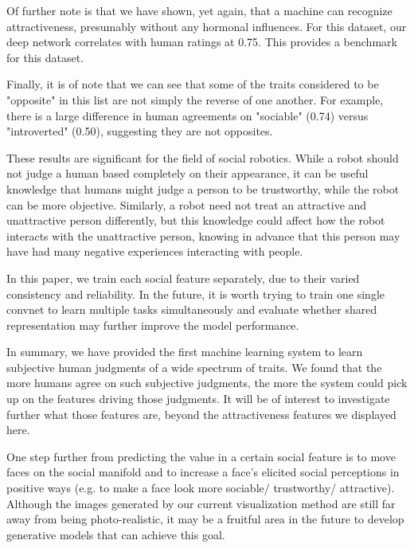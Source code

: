 \documentclass[10pt,twocolumn,letterpaper]{article}
\begin{document}
Of further note is that we have shown, yet again, that a machine can recognize attractiveness, presumably without any hormonal influences. For this dataset, our deep network correlates with human ratings at 0.75. This provides a benchmark for this dataset. 

Finally, it is of note that we can see that some of the traits considered to be "opposite" in this list are not simply the reverse of one another. For example, there is a large difference in human agreements on "sociable" (0.74) versus "introverted" (0.50), suggesting they are not opposites. 

These results are significant for the field of social robotics. While a robot should not judge a human based completely on their appearance, it can be useful knowledge that humans might judge a person to be trustworthy, while the robot can be more objective. Similarly, a robot need not treat an attractive and unattractive person differently, but this knowledge could affect how the robot interacts with the unattractive person, knowing in advance that this person may have had many negative experiences interacting with people.

In this paper, we train each social feature separately, due to their varied consistency and reliability. In the future, it is worth trying to train one single convnet to learn multiple tasks simultaneously and evaluate whether shared representation may further improve the model performance. 

In summary, we have provided the first machine learning system to learn subjective human judgments of a wide spectrum of traits. We found that the more humans agree on such subjective judgments, the more the system could pick up on the features driving those judgments. It will be of interest to investigate further what those features are, beyond the attractiveness features we displayed here. 

One step further from predicting the value in a certain social feature is to move faces on the social manifold and to increase a face's elicited social perceptions in positive ways (e.g. to make a face look more sociable/ trustworthy/ attractive). Although the images generated by our current visualization method are still far away from being photo-realistic, it may be a fruitful area in the future to develop generative models that can achieve this goal. 


{\small


}
\end{document}
